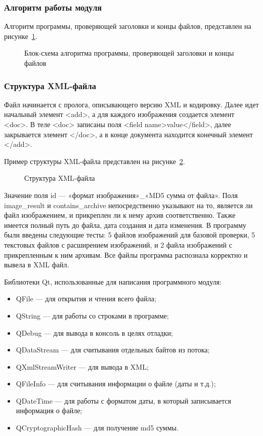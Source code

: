 \subsubsection{Алгоритм работы модуля}
Алгоритм программы, проверяющей заголовки и концы файлов, представлен на рисунке~\ref{block_ilya:block_ilya}.

\begin{figure}[h!]                                          %
\caption{Блок-схема алгоритма программы, проверяющей заголовки и концы файлов}
\label{block_ilya:block_ilya}
\end{figure}

\subsubsection{Структура XML-файла}
Файл начинается с пролога, описывающего версию XML и кодировку. Далее идет начальный элемент <add>, а для каждого изображения создается элемент <doc>. В теле <doc> записаны поля <field name>value</field>, далее закрывается элемент </doc>, а в конце документа находится конечный элемент </add>.

Пример структуры XML-файла представлен на рисунке~\ref{xml_ilya:xml_ilya}.

\begin{figure}[h!]                                          %
\caption{Структура XML-файла}
\label{xml_ilya:xml_ilya}
\end{figure}

Значение поля id --- «формат изображения»\_«MD5 сумма от файла».
Поля image\_result и contains\_archive непосредственно указывают на то, является ли файл изображением, и прикреплен ли к нему архив соответственно. Также имеется полный путь до файла, дата создания и дата изменения.
В программу были введены следующие тесты: 5 файлов изображений для базовой проверки, 5 текстовых файлов с расширением изображений, и 2 файла изображений с прикрепленным к ним архивам. Все файлы программа распознала корректно и вывела в XML файл.


Библиотеки Qt, использованные для написания программного модуля:
\begin{itemize}
\item QFile --- для открытия и чтения всего файла;
\item QString --- для работы со строками в программе;
\item QDebug --- для вывода в консоль в целях отладки;
\item QDataStream --- для считывания отдельных байтов из потока;
\item QXmlStreamWriter --- для вывода в XML;
\item QFileInfo --- для считывания информации о файле (даты и т.д.);
\item QDateTime --- для работы с форматом даты, в который записывается информация о файле;
\item QCryptographicHash --- для получение md5 суммы.
\end{itemize}


